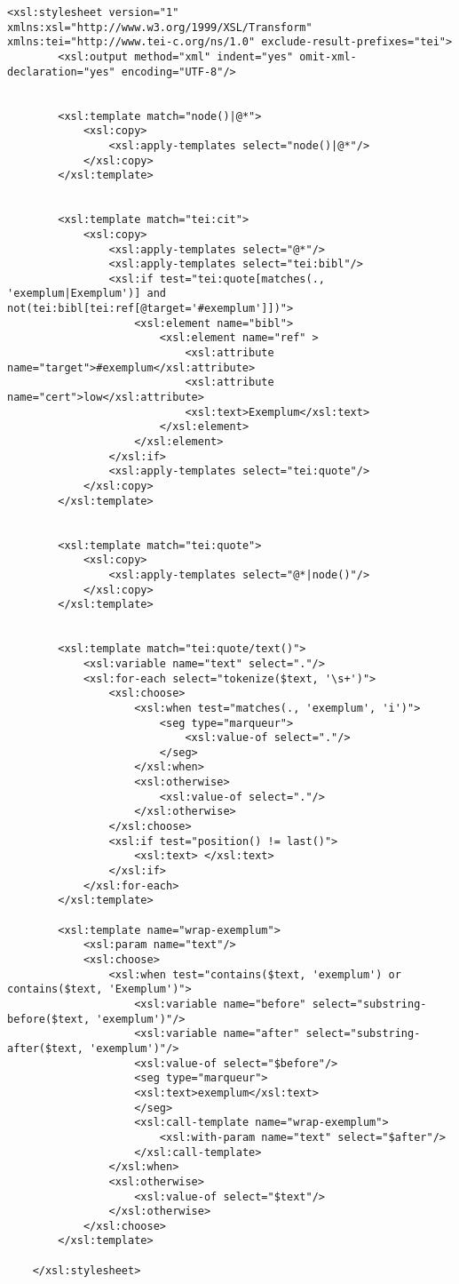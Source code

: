 \begin{lstlisting}[breaklines=true]
	<xsl:stylesheet version="1" xmlns:xsl="http://www.w3.org/1999/XSL/Transform" xmlns:tei="http://www.tei-c.org/ns/1.0" exclude-result-prefixes="tei">
		<xsl:output method="xml" indent="yes" omit-xml-declaration="yes" encoding="UTF-8"/>
	
	
		<xsl:template match="node()|@*">
			<xsl:copy>
				<xsl:apply-templates select="node()|@*"/>
			</xsl:copy>
		</xsl:template>
	
	
		<xsl:template match="tei:cit">
			<xsl:copy>
				<xsl:apply-templates select="@*"/>
				<xsl:apply-templates select="tei:bibl"/>
				<xsl:if test="tei:quote[matches(., 'exemplum|Exemplum')] and not(tei:bibl[tei:ref[@target='#exemplum']])">
					<xsl:element name="bibl">
						<xsl:element name="ref" >
							<xsl:attribute name="target">#exemplum</xsl:attribute>
							<xsl:attribute name="cert">low</xsl:attribute>
							<xsl:text>Exemplum</xsl:text>
						</xsl:element>
					</xsl:element>
				</xsl:if>
				<xsl:apply-templates select="tei:quote"/>
			</xsl:copy>
		</xsl:template>
	
	
		<xsl:template match="tei:quote">
			<xsl:copy>
				<xsl:apply-templates select="@*|node()"/>
			</xsl:copy>
		</xsl:template>
	
	
		<xsl:template match="tei:quote/text()">
			<xsl:variable name="text" select="."/>
			<xsl:for-each select="tokenize($text, '\s+')">
				<xsl:choose>
					<xsl:when test="matches(., 'exemplum', 'i')">
						<seg type="marqueur">
							<xsl:value-of select="."/>
						</seg>
					</xsl:when>
					<xsl:otherwise>
						<xsl:value-of select="."/>
					</xsl:otherwise>
				</xsl:choose>
				<xsl:if test="position() != last()">
					<xsl:text> </xsl:text>
				</xsl:if>
			</xsl:for-each>
		</xsl:template>
	
		<xsl:template name="wrap-exemplum">
			<xsl:param name="text"/>
			<xsl:choose>
				<xsl:when test="contains($text, 'exemplum') or contains($text, 'Exemplum')">
					<xsl:variable name="before" select="substring-before($text, 'exemplum')"/>
					<xsl:variable name="after" select="substring-after($text, 'exemplum')"/>
					<xsl:value-of select="$before"/>
					<seg type="marqueur">
					<xsl:text>exemplum</xsl:text>
					</seg>
					<xsl:call-template name="wrap-exemplum">
						<xsl:with-param name="text" select="$after"/>
					</xsl:call-template>
				</xsl:when>
				<xsl:otherwise>
					<xsl:value-of select="$text"/>
				</xsl:otherwise>
			</xsl:choose>
		</xsl:template>
	
	</xsl:stylesheet>
\end{lstlisting}